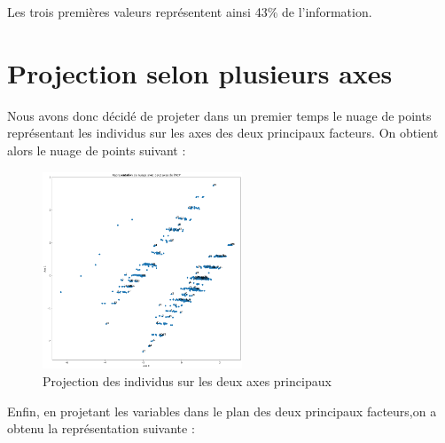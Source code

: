 \documentclass[12,french]{report}
\begin{document}
	Les trois premières valeurs représentent ainsi 43\% de l’information.
	
\section{Projection selon plusieurs axes}
Nous avons donc décidé de projeter dans un premier temps le nuage de points représentant les individus sur les axes des deux principaux facteurs. On obtient alors le nuage de points suivant :\\

\begin{figure}[H]
	\center
	\includegraphics[width=0.53\textwidth]{./Images/16}
	\caption{Projection des individus sur les deux axes principaux}
\end{figure}\vspace{0.1cm}

	Enfin, en projetant les variables dans le plan des deux principaux facteurs,on a obtenu la représentation suivante :\\
\end{document}
